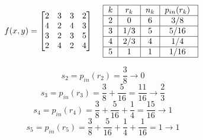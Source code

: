 \begin{center}
    \begin{equation*} 
        \begin{aligned}[t] 
        & f(x,y) = \begin{bmatrix}
            2 & 3 & 3 & 2 \\
            4 & 2 & 4 & 3 \\
            3 & 2 & 3 & 5 \\
            2 & 4 & 2 & 4
          \end{bmatrix}
        &
        \vcenter{\hbox{
            \begin{tabular}{|c|c|c|c|}
                \hline 
                $k$ & $r_k$ & $n_k$ & $p_{in}(r_k)$ \rule{0pt}{2ex}\\ 
                \hline 
                $2$ & $0$ & $6$ & $3/8$ \rule{0pt}{2ex}\\
                \hline 
                $3$ & $1/3$ & $5$ & $5/16$ \rule{0pt}{2ex}\\
                \hline 
                $4$ &$2/3$ & $4$ & $1/4$ \rule{0pt}{2ex}\\
                \hline 
                $5$ & $1$ & $1$ & $1/16$ \rule{0pt}{2ex}\\
                \hline 
            \end{tabular}
        }} %
        \end{aligned}
    \end{equation*}
    
    \label{fig:iji}
\end{center}
\begin{equation*}
    s_2=p_{in}(r_2)=\frac{3}{8}\to0
\end{equation*}
\begin{equation*}
    s_3=p_{in}(r_3)=\frac{3}{8}+\frac{5}{16}=\frac{11}{16}\to\frac{2}{3}
\end{equation*}
\begin{equation*}
    s_4=p_{in}(r_4)=\frac{3}{8}+\frac{5}{16}+\frac{1}{4}=\frac{15}{16}\to1
\end{equation*}
\begin{equation*}
    s_5=p_{in}(r_5)=\frac{3}{8}+\frac{5}{16}+\frac{1}{4}+\frac{1}{16}=1\to1
\end{equation*}
